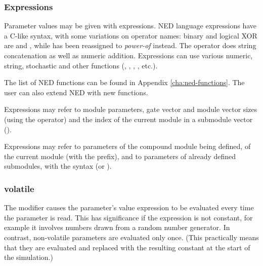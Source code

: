 \subsubsection{Expressions}

Parameter values may be given with expressions. NED language expressions
have a C-like syntax, with some variations on operator names: binary and
logical XOR are \ttt{\#} and \ttt{\#\#}, while \ttt{\^} has been reassigned
to \textit{power-of} instead. The \ttt{+} operator does string
concatenation as well as numeric addition. Expressions can use various
numeric, string, stochastic and other functions (, ,
, , etc.).

\begin{note}
    The list of NED functions can be found in Appendix \ref{cha:ned-functions}.
    The user can also extend NED with new functions.
\end{note}


Expressions may refer to module parameters, gate vector and module vector sizes
(using the  operator) and the index of the current module
in a submodule vector ().


Expressions may refer to parameters of the compound module being defined,
of the current module (with the  prefix), and to parameters
of already defined submodules, with the syntax 
(or ).




\subsubsection{volatile}

The  modifier causes the parameter's value expression to
be evaluated every time the parameter is read. This has significance if the
expression is not constant, for example it involves numbers drawn from a
random number generator. In contrast, non-volatile parameters are evaluated
only once. (This practically means that they are evaluated and replaced
with the resulting constant at the start of the simulation.)

